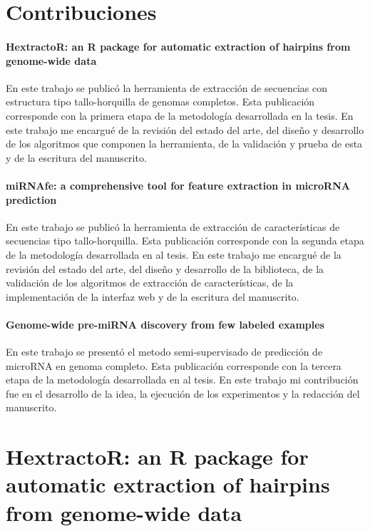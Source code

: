 \begin{appendices}
	\chapter{Contribuciones}
	\subsubsection*{HextractoR: an R package for automatic extraction of hairpins from genome-wide data}
	En este trabajo se publicó la herramienta de extracción de secuencias con estructura tipo tallo-horquilla de genomas completos. Esta publicación
	corresponde con la primera etapa de la metodología desarrollada en la tesis. En este trabajo me encargué de la revisión del estado del arte, del diseño
	y desarrollo de los algoritmos que componen la herramienta, de la validación y prueba de esta y de la escritura del manuscrito.

	\subsubsection*{miRNAfe: a comprehensive tool for feature extraction in microRNA prediction}
	En este trabajo se publicó la herramienta de extracción de características de secuencias tipo tallo-horquilla. Esta publicación corresponde con la segunda
	etapa de la metodología desarrollada en al tesis. En este trabajo me encargué de la revisión del estado del arte, del diseño y desarrollo de la biblioteca,
	de la validación de los algoritmos de extracción de características, de la implementación de la interfaz web y de la escritura del manuscrito.

	\subsubsection*{Genome-wide pre-miRNA discovery from few labeled examples}
	En este trabajo se presentó el metodo semi-supervisado de predicción de microRNA en genoma completo. Esta publicación corresponde con la tercera etapa de
	la metodología desarrollada en al tesis. En este trabajo mi contribución fue en el desarrollo de la idea, la ejecución de los experimentos y la redacción
	del manuscrito.


	\blankpage
	\chapter{HextractoR: an R package for automatic extraction of hairpins from genome-wide data}
	\label{sec:hextractor}
	\blankpage
	


\end{appendices}
